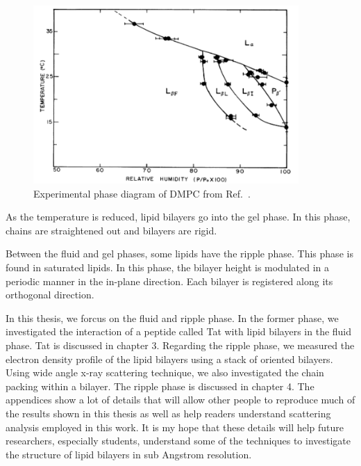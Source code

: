 \begin{figure}
  \centering
  \includegraphics[width=0.9\textwidth]{figures/ripple/smith_phase_diagram}
  \caption{Experimental phase diagram of DMPC from Ref.~\cite{ref:Smith88}.}
  \label{fig:phase_diagram}
\end{figure}

As the temperature is reduced, lipid bilayers go into the gel phase.
In this phase, chains are straightened out and bilayers are rigid.

Between the fluid and gel phases, some lipids have the ripple phase.
This phase is found in saturated lipids. In this phase, the bilayer
height is modulated in a periodic manner in the in-plane direction.
Each bilayer is registered along its orthogonal direction.

In this thesis, we forcus on the fluid and ripple phase. In the former phase,
we investigated the interaction of a peptide called Tat with lipid bilayers
in the fluid phase. 
Tat is discussed in chapter 3.
Regarding the ripple phase, we measured the electron density profile of the lipid
bilayers using a stack of oriented bilayers. Using wide angle x-ray scattering
technique, we also investigated the chain packing within a bilayer. 
The ripple phase is discussed in chapter 4. 
The appendices show a lot of details that will
allow other people to reproduce much of the results shown in this thesis 
as well as help readers understand scattering analysis employed in this work.
It is my hope that these details will help future researchers,
especially students, understand some of the techniques to investigate the
structure of lipid bilayers in sub Angstrom resolution.